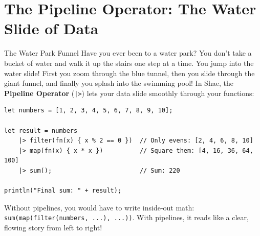 \section{The Pipeline Operator: The Water Slide of Data}

\begin{kidbox}{The Water Park Funnel}
Have you ever been to a water park?
You don't take a bucket of water and walk it up the stairs one step at a time.
You jump into the water slide!
First you zoom through the blue tunnel, then you slide through the giant funnel, and finally you splash into the swimming pool!
In Shae, the \textbf{Pipeline Operator} (\texttt{|>}) lets your data slide smoothly through your functions:
\begin{lstlisting}[language=shaelang]
let numbers = [1, 2, 3, 4, 5, 6, 7, 8, 9, 10];

let result = numbers
    |> filter(fn(x) { x % 2 == 0 })  // Only evens: [2, 4, 6, 8, 10]
    |> map(fn(x) { x * x })          // Square them: [4, 16, 36, 64, 100]
    |> sum();                        // Sum: 220

println("Final sum: " + result);
\end{lstlisting}
Without pipelines, you would have to write inside-out math: \texttt{sum(map(filter(numbers, ...), ...))}.
With pipelines, it reads like a clear, flowing story from left to right!
\end{kidbox}
